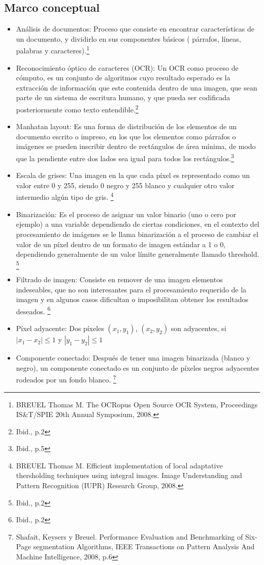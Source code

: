 \documentclass[a4paper, 11pt, oneside]{article}
\begin{document}
	\subsection{Marco conceptual}
	\begin{itemize}
    \item Análisis de documentos: Proceso que consiste en encontrar características de un documento,
    y dividirlo en sus componentes básicos ( párrafos, líneas, palabras y caracteres).\footnote{
	BREUEL Thomas M. The OCRopus Open Source OCR System, Proceedings IS\&T/SPIE 20th Annual Symposium, 2008.}
    \item Reconocimiento óptico de caracteres (OCR): Un OCR como proceso de cómputo, es un conjunto de
    algoritmos cuyo resultado esperado es la extracción de información  que este contenida dentro de
    una imagen, que sean parte de un sistema de escritura humano, y que pueda ser codificada
    posteriormente como texto entendible.\footnote{Ibid., p.2}
    \item Manhatan layout: Es una forma de distribución de los elementos de un documento escrito o
    impreso, en los que los elementos como párrafos o imágenes se pueden inscribir
    dentro de rectángulos de área mínima, de modo que la pendiente entre dos lados sea igual para
    todos los rectángulos.\footnote{Ibid., p.5}
    \item Escala de grises: Una imagen en la que cada píxel es representado como un valor entre 0 y
    255, siendo 0 negro y 255 blanco y cualquier otro valor intermedio algún tipo de gris. \footnote{
    BREUEL Thomas M. Efficient implementation of local adaptative thersholding techniques using integral 
    images. Image Understanding and Pattern Recognition (IUPR) Research Group, 2008.}
    \item Binarización:	Es el proceso de asignar un valor binario (uno o cero por ejemplo) a una
    variable dependiendo de	ciertas condiciones, en el contexto del procesamiento de imágenes se le
    llama binarización a el proceso de cambiar el valor de un píxel dentro de un formato de imagen
    estándar a 1 o 0, dependiendo generalmente de un valor límite generalmente llamado threshold.
    \footnote{Ibid., p.2}
    \item Filtrado de imagen: Consiste en remover de una imagen elementos indeseables, que no
    son interesantes para el procesamiento requerido de la imagen y en algunos casos dificultan
    o imposibilitan obtener los resultados deseados.
    \footnote{Ibid., p.2}
    \item Píxel adyacente: Dos píxeles $(x_1,y_1)$, $(x_2,y_2)$ son adyacentes, si $|x_1-x_2| \le 1$
    y $|y_1-y_2| \le 1$
    \item Componente conectado: Después de tener una imagen binarizada (blanco y negro), un
    componente conectado es un conjunto de píxeles negros adyacentes rodeados por un fondo blanco.
    \footnote{Shafait, Keysers y Breuel. Performance Evaluation and Benchmarking of Six-Page segmentation
    Algorithms, IEEE Transactions on Pattern Analysis And Machine Intelligence, 2008, p.6}
   
	\end{itemize}
	
\end{document}
